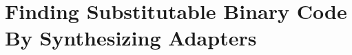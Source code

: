 \chapter{Finding Substitutable Binary Code By Synthesizing Adapters}
\label{adapter_synthesis_chapter}

